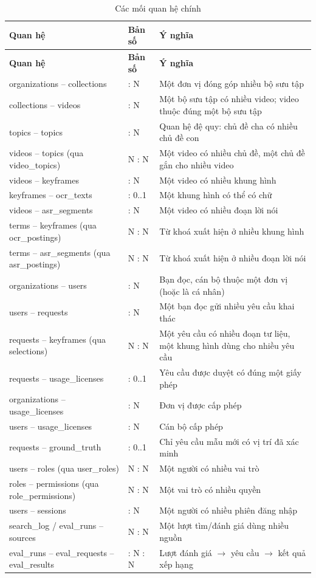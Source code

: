 {\renewcommand{\arraystretch}{1.15}
\begin{longtable}{>{\raggedright\arraybackslash}p{5.4cm} >{\centering\arraybackslash}p{1.4cm} >{\raggedright\arraybackslash}p{7.0cm}}
\caption{Các mối quan hệ chính}\label{tab:relations}\\
\toprule \textbf{Quan hệ} & \textbf{Bản số} & \textbf{Ý nghĩa} \\ \midrule \endfirsthead
\toprule \textbf{Quan hệ} & \textbf{Bản số} & \textbf{Ý nghĩa} \\ \midrule \endhead
\bottomrule \endfoot
organizations -- collections & 1 : N & Một đơn vị đóng góp nhiều bộ sưu tập \\
collections -- videos & 1 : N & Một bộ sưu tập có nhiều video; video thuộc đúng một bộ sưu tập \\
topics -- topics & 1 : N & Quan hệ đệ quy: chủ đề cha có nhiều chủ đề con \\
videos -- topics (qua video\_topics) & N : N & Một video có nhiều chủ đề, một chủ đề gắn cho nhiều video \\
videos -- keyframes & 1 : N & Một video có nhiều khung hình \\
keyframes -- ocr\_texts & 1 : 0..1 & Một khung hình có thể có chữ \\
videos -- asr\_segments & 1 : N & Một video có nhiều đoạn lời nói \\
terms -- keyframes (qua ocr\_postings) & N : N & Từ khoá xuất hiện ở nhiều khung hình \\
terms -- asr\_segments (qua asr\_postings) & N : N & Từ khoá xuất hiện ở nhiều đoạn lời nói \\
organizations -- users & 1 : N & Bạn đọc, cán bộ thuộc một đơn vị (hoặc là cá nhân) \\
users -- requests & 1 : N & Một bạn đọc gửi nhiều yêu cầu khai thác \\
requests -- keyframes (qua selections) & N : N & Một yêu cầu có nhiều đoạn tư liệu, một khung hình dùng cho nhiều yêu cầu \\
requests -- usage\_licenses & 1 : 0..1 & Yêu cầu được duyệt có đúng một giấy phép \\
organizations -- usage\_licenses & 1 : N & Đơn vị được cấp phép \\
users -- usage\_licenses & 1 : N & Cán bộ cấp phép \\
requests -- ground\_truth & 1 : 0..1 & Chỉ yêu cầu mẫu mới có vị trí đã xác minh \\
users -- roles (qua user\_roles) & N : N & Một người có nhiều vai trò \\
roles -- permissions (qua role\_permissions) & N : N & Một vai trò có nhiều quyền \\
users -- sessions & 1 : N & Một người có nhiều phiên đăng nhập \\
search\_log / eval\_runs -- sources & N : N & Một lượt tìm/đánh giá dùng nhiều nguồn \\
eval\_runs -- eval\_requests -- eval\_results & 1 : N : N & Lượt đánh giá $\rightarrow$ yêu cầu $\rightarrow$ kết quả xếp hạng \\
\end{longtable}}

